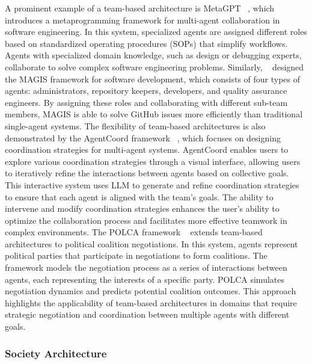 A prominent example of a team-based architecture is MetaGPT ~\cite{metagpt}, which introduces a metaprogramming framework for multi-agent collaboration in software engineering. In this system, specialized agents are assigned different roles based on standardized operating procedures (SOPs) that simplify workflows. Agents with specialized domain knowledge, such as design or debugging experts, collaborate to solve complex software engineering problems. 
Similarly, ~\cite{magis_mas_for_github} designed the MAGIS framework for software development, which consists of four types of agents: administrators, repository keepers, developers, and quality assurance engineers. By assigning these roles and collaborating with different sub-team members, MAGIS is able to solve GitHub issues more efficiently than traditional single-agent systems. 
The flexibility of team-based architectures is also demonstrated by the AgentCoord framework ~\cite{agentcoord}, which focuses on designing coordination strategies for multi-agent systems. AgentCoord enables users to explore various coordination strategies through a visual interface, allowing users to iteratively refine the interactions between agents based on collective goals. This interactive system uses LLM to generate and refine coordination strategies to ensure that each agent is aligned with the team's goals. The ability to intervene and modify coordination strategies enhances the user's ability to optimize the collaboration process and facilitates more effective teamwork in complex environments. 
The POLCA framework ~\cite{polca_mas_for_political} extends team-based architectures to political coalition negotiations. In this system, agents represent political parties that participate in negotiations to form coalitions. The framework models the negotiation process as a series of interactions between agents, each representing the interests of a specific party. POLCA simulates negotiation dynamics and predicts potential coalition outcomes. This approach highlights the applicability of team-based architectures in domains that require strategic negotiation and coordination between multiple agents with different goals.

\subsubsection{Society Architecture}

